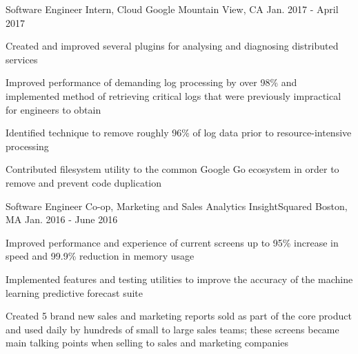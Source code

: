 

\begin{cventries}

  \cventry
    {Software Engineer Intern, Cloud} %
    {Google} %
    {Mountain View, CA} %
    {Jan. 2017 - April 2017} %
    {
      \begin{cvitems} %
        \item {Created and improved several plugins for analysing and diagnosing distributed services}
        \item {Improved performance of demanding log processing by over 98\% and implemented method of retrieving critical logs that were \mbox{previously} impractical for engineers to obtain}
        \item {Identified technique to remove roughly 96\% of log data prior to resource-intensive processing}
        \item {Contributed filesystem utility to the common Google Go ecosystem in order to remove and prevent code duplication}
      \end{cvitems}
    }

  \cventry
    {Software Engineer Co-op, Marketing and Sales Analytics} %
    {InsightSquared} %
    {Boston, MA} %
    {Jan. 2016 - June 2016} %
    {
      \begin{cvitems} %
        \item {Improved performance and experience of current screens up to 95\% increase in speed and 99.9\% reduction in memory usage}
        \item {Implemented features and testing utilities to improve the accuracy of the machine learning predictive forecast suite}
        \item {Created 5 brand new sales and marketing reports sold as part of the core product and used daily by hundreds of small to large sales teams; these screens became main talking points when selling to sales and marketing companies}
      \end{cvitems}
    }


\end{cventries}
